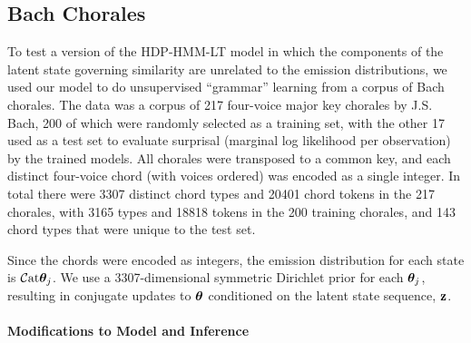\subsection{Bach Chorales}

To test a version of the HDP-HMM-LT model in which the components of
the latent state governing similarity are unrelated to the emission
distributions, we used our model to do unsupervised ``grammar''
learning from a corpus of Bach chorales.  The data was a corpus of 217 four-voice
major key chorales by J.S. Bach, 200 of which were randomly selected
as a training set, with the other 17 used as a test set to evaluate
surprisal (marginal log likelihood per observation) by the trained
models.  All chorales were transposed to a common key, and each
distinct four-voice chord (with voices ordered) 
was encoded as a single integer.  In total
there were 3307 distinct chord types and 20401 chord tokens in the 217
chorales, with 3165 types and 18818 tokens in the 200 training
chorales, and 143 chord types that were unique to the test set.

Since the chords were encoded as integers, the emission distribution
for each state is $\mathcal{C}\mathrm{at}{\boldsymbol{\theta}_j}$.  We use a 3307-dimensional 
symmetric Dirichlet prior for each $\boldsymbol{\theta}_j$, resulting in conjugate 
updates to $\boldsymbol{\theta}$ conditioned on the latent state sequence, $\mathbf{z}$.

\paragraph{Modifications to Model and Inference}
\label{sec:model-inference}

